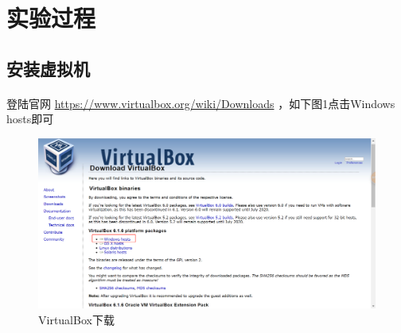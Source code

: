 \documentclass[12pt]{article}
\begin{document}
\section{\LARGE 实验过程}

	\subsection{\Large 安装虚拟机}
	\paragraph{}登陆官网 \url{https://www.virtualbox.org/wiki/Downloads} ，如下图1点击Windows hosts即可
		\begin{figure}[H]
			\centering
			\includegraphics[width=14cm]{./figures/VirtualBoxDownLoad.png}
			\caption{VirtualBox下载} 
		\end{figure}
\end{document}
